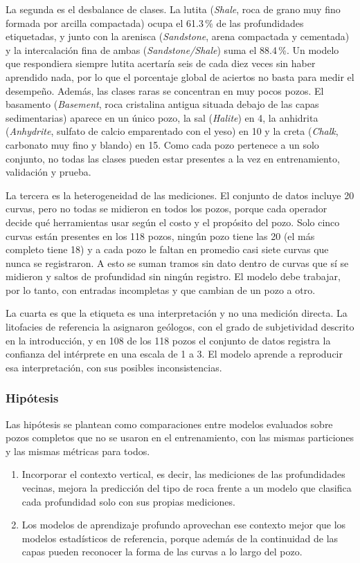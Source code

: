 \documentclass[11pt,a4paper]{article}
\begin{document}
La segunda es el desbalance de clases. La lutita (\emph{Shale}, roca de grano muy fino formada por arcilla compactada) ocupa el 61.3\,\% de las profundidades etiquetadas, y junto con la arenisca (\emph{Sandstone}, arena compactada y cementada) y la intercalación fina de ambas (\emph{Sandstone/Shale}) suma el 88.4\,\%. Un modelo que respondiera siempre lutita acertaría seis de cada diez veces sin haber aprendido nada, por lo que el porcentaje global de aciertos no basta para medir el desempeño. Además, las clases raras se concentran en muy pocos pozos. El basamento (\emph{Basement}, roca cristalina antigua situada debajo de las capas sedimentarias) aparece en un único pozo, la sal (\emph{Halite}) en 4, la anhidrita (\emph{Anhydrite}, sulfato de calcio emparentado con el yeso) en 10 y la creta (\emph{Chalk}, carbonato muy fino y blando) en 15. Como cada pozo pertenece a un solo conjunto, no todas las clases pueden estar presentes a la vez en entrenamiento, validación y prueba.

La tercera es la heterogeneidad de las mediciones. El conjunto de datos incluye 20 curvas, pero no todas se midieron en todos los pozos, porque cada operador decide qué herramientas usar según el costo y el propósito del pozo. Solo cinco curvas están presentes en los 118 pozos, ningún pozo tiene las 20 (el más completo tiene 18) y a cada pozo le faltan en promedio casi siete curvas que nunca se registraron. A esto se suman tramos sin dato dentro de curvas que sí se midieron y saltos de profundidad sin ningún registro. El modelo debe trabajar, por lo tanto, con entradas incompletas y que cambian de un pozo a otro.

La cuarta es que la etiqueta es una interpretación y no una medición directa. La litofacies de referencia la asignaron geólogos, con el grado de subjetividad descrito en la introducción, y en 108 de los 118 pozos el conjunto de datos registra la confianza del intérprete en una escala de 1 a 3. El modelo aprende a reproducir esa interpretación, con sus posibles inconsistencias.

\subsubsection{Hipótesis}

Las hipótesis se plantean como comparaciones entre modelos evaluados sobre pozos completos que no se usaron en el entrenamiento, con las mismas particiones y las mismas métricas para todos.

\begin{enumerate}[label=\textbf{H\arabic*.}, leftmargin=*]
    \item Incorporar el contexto vertical, es decir, las mediciones de las profundidades vecinas, mejora la predicción del tipo de roca frente a un modelo que clasifica cada profundidad solo con sus propias mediciones.
    \item Los modelos de aprendizaje profundo aprovechan ese contexto mejor que los modelos estadísticos de referencia, porque además de la continuidad de las capas pueden reconocer la forma de las curvas a lo largo del pozo.
\end{enumerate}
\end{document}
